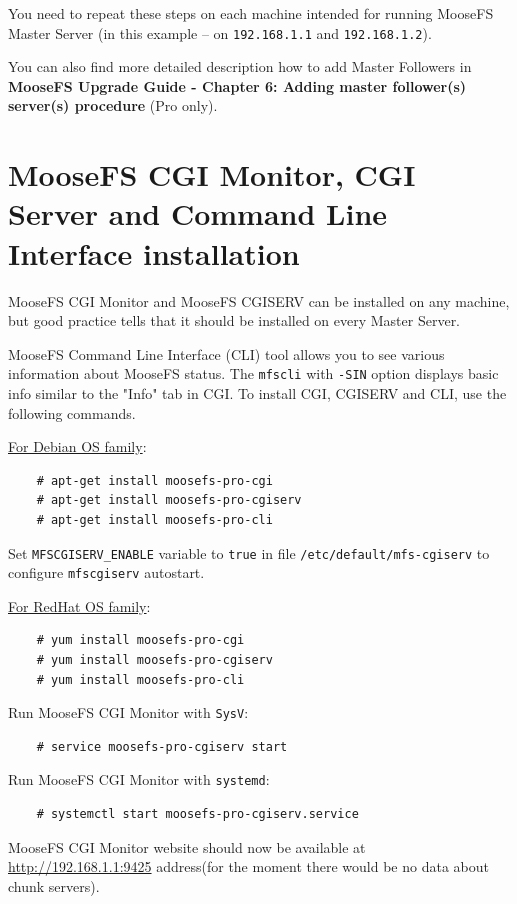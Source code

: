 \documentclass[a4paper,11pt,english]{report}
\def\code#1{\texttt{#1}}
\begin{document}
		
		You need to repeat these steps on each machine intended for running MooseFS Master Server (in this example -- on \code{192.168.1.1} and \code{192.168.1.2}).
		
		You can also find more detailed description how to add Master Followers in \textbf{MooseFS Upgrade Guide - Chapter 6: Adding master follower(s) server(s) procedure} (Pro only).
	
		\section{MooseFS CGI Monitor, CGI Server and Command Line Interface installation}
		MooseFS CGI Monitor and MooseFS CGISERV can be installed on any machine, but good practice tells that it should be installed on every Master Server.
		
		MooseFS Command Line Interface (CLI) tool allows you to see various information about MooseFS status. The \code{mfscli} with \code{-SIN} option displays basic info similar to the "Info" tab in CGI. To install CGI, CGISERV and CLI, use the following commands.

		\underline{For Debian OS family}:

		\begin{lstlisting}
	# apt-get install moosefs-pro-cgi
	# apt-get install moosefs-pro-cgiserv
	# apt-get install moosefs-pro-cli
		\end{lstlisting}

		Set \code{MFSCGISERV\_ENABLE} variable to \code{true} in file \code{/etc/default/mfs-cgiserv} to configure \code{mfscgiserv} autostart.
	
		\underline{For RedHat OS family}:

		\begin{lstlisting}
	# yum install moosefs-pro-cgi
	# yum install moosefs-pro-cgiserv
	# yum install moosefs-pro-cli
	\end{lstlisting}
	
		
		Run MooseFS CGI Monitor with \code{SysV}:
		\begin{lstlisting}
	# service moosefs-pro-cgiserv start
		\end{lstlisting}
		
		Run MooseFS CGI Monitor with \code{systemd}:
		\begin{lstlisting}
	# systemctl start moosefs-pro-cgiserv.service
		\end{lstlisting}
		MooseFS CGI Monitor website should now be available at \url{http://192.168.1.1:9425} address(for the moment there would be no data about chunk servers).
		
\end{document}
